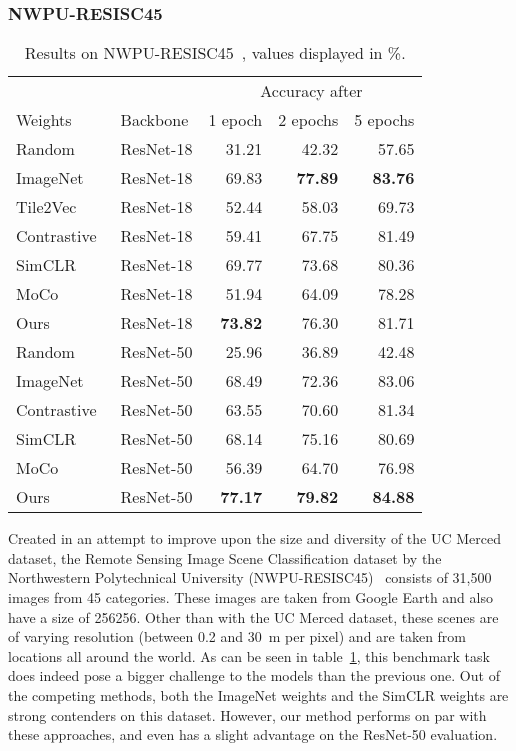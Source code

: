 \documentclass[journal]{IEEEtran}
\begin{document}
\subsubsection{NWPU-RESISC45}
\begin{table}
  \center
  \caption{
    Results on NWPU-RESISC45~\cite{resisc45}, values displayed in \%.
  }\label{table:resisc45}
  \begin{tabular}{llrrr}
    \toprule
    &&\multicolumn{3}{c}{Accuracy after}\\
    Weights&Backbone&1 epoch&2 epochs&5 epochs\\
    \midrule
    Random                        & ResNet-18 & 31.21 & 42.32 & 57.65 \\
    ImageNet                      & ResNet-18 & 69.83 & \textbf{77.89} & \textbf{83.76} \\
    Tile2Vec~\cite{tile2vec}      & ResNet-18 & 52.44 & 58.03 & 69.73 \\
    Contrastive~\cite{simclr}     & ResNet-18 & 59.41 & 67.75 & 81.49 \\
    SimCLR~\cite{simclr}          & ResNet-18 & 69.77 & 73.68 & 80.36 \\
    MoCo~\cite{he_momentum_2020}  & ResNet-18 & 51.94 & 64.09 & 78.28 \\
    Ours                          & ResNet-18 & \textbf{73.82} & 76.30 & 81.71 \\
    \midrule
    Random                        & ResNet-50 & 25.96 & 36.89 & 42.48 \\
    ImageNet                      & ResNet-50 & 68.49 & 72.36 & 83.06 \\
    Contrastive~\cite{simclr}     & ResNet-50 & 63.55 & 70.60 & 81.34 \\
    SimCLR~\cite{simclr}          & ResNet-50 & 68.14 & 75.16 & 80.69 \\
    MoCo~\cite{he_momentum_2020}  & ResNet-50 & 56.39 & 64.70 & 76.98 \\
    Ours                          & ResNet-50 & \textbf{77.17} & \textbf{79.82} & \textbf{84.88} \\
    \bottomrule
  \end{tabular}
\end{table}
 Created in an attempt to improve upon the size and diversity of the UC Merced dataset,
the Remote Sensing Image Scene Classification dataset by the
Northwestern Polytechnical University (NWPU-RESISC45)~\cite{resisc45}
consists of 31,500 images from 45 categories.
These images are taken from Google Earth and also have a size of 256256.
Other than with the UC Merced dataset,
these scenes are of varying resolution (between 0.2 and \SI{30}{\metre} per pixel)
and are taken from locations all around the world.
As can be seen in table~\ref{table:resisc45},
this benchmark task does indeed pose a bigger challenge to the models
than the previous one.
Out of the competing methods, both the ImageNet weights and
the SimCLR weights are strong contenders on this dataset.
However, our method performs on par with these approaches,
and even has a slight advantage on the ResNet-50 evaluation.
\end{document}

